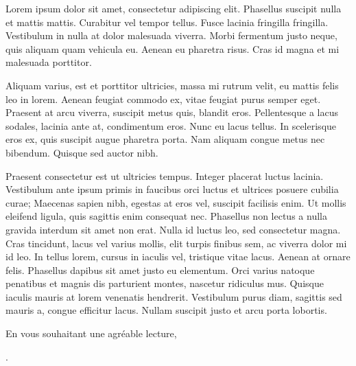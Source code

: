 %
\begin{acknowledgments}

Lorem ipsum dolor sit amet, consectetur adipiscing elit. Phasellus suscipit nulla et mattis mattis. Curabitur vel tempor tellus. 
Fusce lacinia fringilla fringilla. Vestibulum in nulla at dolor malesuada viverra. 
Morbi fermentum justo neque, quis aliquam quam vehicula eu. Aenean eu pharetra risus. 
Cras id magna et mi malesuada porttitor. 

Aliquam varius, est et porttitor ultricies, massa mi rutrum velit, eu mattis felis leo in lorem.
Aenean feugiat commodo ex, vitae feugiat purus semper eget. Praesent at arcu viverra, suscipit metus quis, blandit eros.
Pellentesque a lacus sodales, lacinia ante at, condimentum eros. Nunc eu lacus tellus. In scelerisque eros ex,
quis suscipit augue pharetra porta. Nam aliquam congue metus nec bibendum. Quisque sed auctor nibh. 

Praesent consectetur est ut ultricies tempus. Integer placerat luctus lacinia.
Vestibulum ante ipsum primis in faucibus orci luctus et ultrices posuere cubilia curae;
Maecenas sapien nibh, egestas at eros vel, suscipit facilisis enim. Ut mollis eleifend ligula,
quis sagittis enim consequat nec. Phasellus non lectus a nulla gravida interdum sit amet non erat.
Nulla id luctus leo, sed consectetur magna. Cras tincidunt, lacus vel varius mollis, elit turpis finibus sem,
ac viverra dolor mi id leo. In tellus lorem, cursus in iaculis vel, tristique vitae lacus. Aenean at ornare felis.
Phasellus dapibus sit amet justo eu elementum. Orci varius natoque penatibus et magnis dis parturient montes,
nascetur ridiculus mus. Quisque iaculis mauris at lorem venenatis hendrerit. Vestibulum purus diam, sagittis sed mauris a,
congue efficitur lacus. Nullam suscipit justo et arcu porta lobortis. 

\vspace{10pt}

\begin{flushright}
En vous souhaitant une agréable lecture,

\theauthor{}.
\end{flushright}
\end{acknowledgments}
